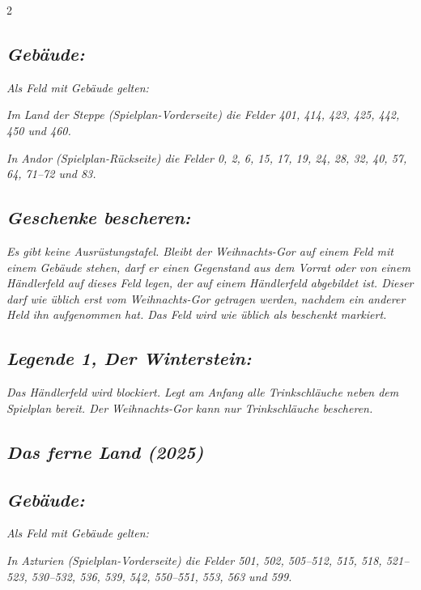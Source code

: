 \documentclass[10pt, a4paper, oneside]{book}
\newcommand{\fan}[1]{\textit{#1}}
\begin{document}
\begin{multicols*}{2}
\begin{bgcolor}
\subsection{\fan{Gebäude:}}

\fan{Als Feld mit Gebäude gelten:}

\fan{\bullet{} Im Land der Steppe (Spielplan-Vorderseite) die Felder 401, 414, 423, 425, 442, 450 und 460.}

\fan{\bullet{} In Andor (Spielplan-Rückseite) die Felder 0, 2, 6, 15, 17, 19, 24, 28, 32, 40, 57, 64, 71–72 und 83.}

\subsection{\fan{Geschenke bescheren:}}

\fan{Es gibt keine Ausrüstungstafel. Bleibt der Weihnachts-Gor auf einem Feld mit einem Gebäude stehen, darf er einen Gegenstand aus dem Vorrat oder von einem Händlerfeld auf dieses Feld legen, der auf einem Händlerfeld abgebildet ist. Dieser darf wie üblich erst vom Weihnachts-Gor getragen werden, nachdem ein anderer Held ihn aufgenommen hat. Das Feld wird wie üblich als beschenkt markiert.}


\subsection{\fan{Legende 1, Der Winterstein:}}


\fan{Das Händlerfeld wird blockiert. Legt am Anfang alle Trinkschläuche neben dem Spielplan bereit. Der Weihnachts-Gor kann nur Trinkschläuche bescheren.}




\end{bgcolor}


\begin{bgcolor}
\section{\fan{Das ferne Land (2025)}}

\subsection{\fan{Gebäude:}}

\fan{Als Feld mit Gebäude gelten:}

\fan{\bullet{} In Azturien (Spielplan-Vorderseite) die Felder 501, 502, 505–512, 515, 518, 521–523, 530–532, 536, 539, 542, 550–551, 553, 563 und 599.}


\end{bgcolor}
\end{multicols*}
\end{document}
